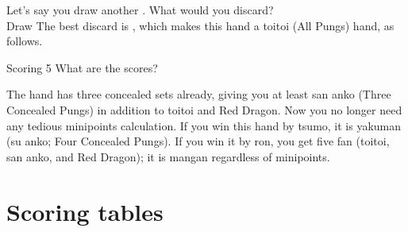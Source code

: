 \bigskip

Let's say you draw another {\large{}}. What would you discard? 
\bp
{}\zhong\zhong\zhong~\\
\hspace{290pt}\footnotesize{Draw}
\ep
The best discard is {\large{}}, which makes this hand a {\jap toitoi} (All Pungs) hand, as follows.

\begin{itembox}[r]{Scoring 5}
\bp
{}\zhong\zhong\zhong
\ep
\vspace{-10pt} What are the scores?
\end{itembox}

\bigskip
\noindent The hand has three concealed sets already, giving you at least {\jap san anko} (Three Concealed Pungs) in addition to {\jap toitoi} and Red Dragon. Now you no longer need any tedious minipoints calculation. If you win this hand by {\jap tsumo}, it is {\jap yakuman} ({\jap su anko}; Four Concealed Pungs). If you win it by {\jap ron}, you get five {\jap fan} ({\jap toitoi}, {\jap san anko}, and Red Dragon); it is {\jap mangan} regardless of minipoints. 

\newpage
\section{Scoring tables}

